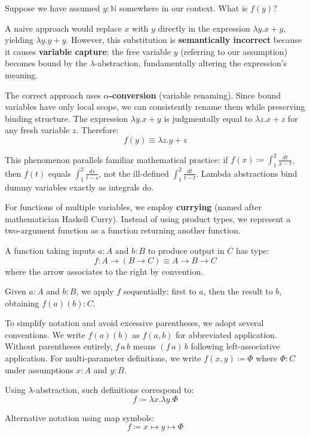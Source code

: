 Suppose we have assumed $y : \mathbb{N}$ somewhere in our context. What is $f(y)$?

A naive approach would replace $x$ with $y$ directly in the expression $\lambda y. x + y$, yielding $\lambda y. y + y$. However, this substitution is \textbf{semantically incorrect} because it causes \textbf{variable capture}: the free variable $y$ (referring to our assumption) becomes bound by the $\lambda$-abstraction, fundamentally altering the expression's meaning.

The correct approach uses \textbf{$\alpha$-conversion} (variable renaming).
Since bound variables have only local scope, we can consistently rename them while preserving binding structure.
The expression $\lambda y. x + y$ is judgmentally equal to $\lambda z. x + z$ for any fresh variable $z$. Therefore:
$$ f(y) \equiv \lambda z. y + z $$

This phenomenon parallels familiar mathematical practice: if $f(x) \coloneqq \int_1^2 \frac{dt}{x-t}$,
then $f(t)$ equals $\int_1^2 \frac{ds}{t-s}$, not the ill-defined $\int_1^2 \frac{dt}{t-t}$.
Lambda abstractions bind dummy variables exactly as integrals do.

For functions of multiple variables, we employ \textbf{currying} (named after mathematician Haskell Curry). Instead of using product types, we represent a two-argument function as a function returning another function.

A function taking inputs $a : A$ and $b : B$ to produce output in $C$ has type:
$$ f : A \to (B \to C) \equiv A \to B \to C $$
where the arrow associates to the right by convention.

Given $a : A$ and $b : B$, we apply $f$ sequentially: first to $a$, then the result to $b$, obtaining $f(a)(b) : C$.

To simplify notation and avoid excessive parentheses, we adopt several conventions. We write $f(a)(b)$ as $f(a, b)$ for abbreviated application. Without parentheses entirely, $f \, a \, b$ means $(f \, a) \, b$ following left-associative application. For multi-parameter definitions, we write $f(x, y) \coloneqq \Phi$ where $\Phi : C$ under assumptions $x : A$ and $y : B$.

Using $\lambda$-abstraction, such definitions correspond to:
$$ f \coloneqq \lambda x. \lambda y. \Phi $$

Alternative notation using map symbols:
$$ f \coloneqq x \mapsto y \mapsto \Phi $$

